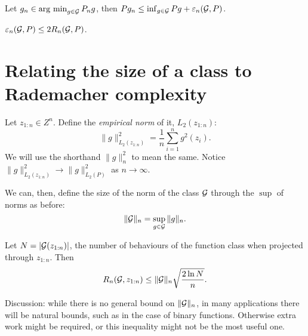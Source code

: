 \documentclass[twoside]{article}
\newcommand{\zn}{z_{1:n}}
\newcommand{\supg}{\sup_{g \in \cG}}
\begin{document}
\begin{proposition}
    Let $g_n \in \operatorname*{arg\ min}_{g \in \mathcal{G}} P_n g$, then $P g_n \leq \inf_{g \in \mathcal{G}} Pg + \varepsilon_n(\mathcal{G}, P)$.
\end{proposition}

\begin{proposition} \label{prop:16_emd_rademacher}
    $\varepsilon_n(\mathcal{G}, P) \leq 2  R_n(\mathcal{G}, P)$.
\end{proposition}

\section{Relating the size of a class to Rademacher complexity}

\begin{definition}    
    Let $\zn \in Z^n$. Define the \textit{empirical norm} of it, $L_2(\zn)$:
    \begin{equation*}
        \| g \|^2_{L_2(\zn)} = \frac1n \sum_{i=1}^n g^2(z_i).        
    \end{equation*}
    We will use the shorthand $ \| g \|^2_n$ to mean the same. Notice $ \| g \|^2_{L_2(\zn)} \to \| g \|^2_{L_2(P)} $ as $n \to \infty$.
\end{definition}

\begin{definition}
    We can, then, define the size of the norm of the class $\mathcal{G}$ through the $\sup$ of norms as before:
    \begin{equation*}
        \| \cG \|_{n} = \supg \| g \|_n.        
    \end{equation*}
\end{definition}

\begin{proposition} \label{prop:rad_upper_bound}
    Let $N = | \cG(\zn) |$, the number of behaviours of the function class when projected through $\zn$. Then
    \begin{equation*}
        R_n(\cG, \zn) \leq \| \cG \|_{n} \sqrt{ \frac {2 \ln N} {n} }.
    \end{equation*}
\end{proposition}

Discussion: while there is no general bound on $ \| \mathcal{G} \|_{n}$, in many applications there will be natural bounds, such as in the case of binary functions. Otherwise extra work might be required, or this inequality might not be the most useful one.
\end{document}
